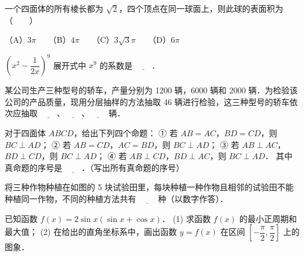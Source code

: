 \begin{question}
一个四面体的所有棱长都为 $\sqrt{2}$，四个顶点在同一球面上，则此球的表面积为\mbox{（　　）}

（A）$3\pi$　　（B）$4\pi$　　（C）$3\sqrt{3}\pi$　　（D）$6\pi$

\end{question}
\begin{question}
$\left(x^2 - \dfrac{1}{2x}\right)^9$ 展开式中 $x^9$ 的系数是 $\underline{\hspace{2em}}$．

\end{question}
\begin{question}
某公司生产三种型号的轿车，产量分别为 1200 辆，6000 辆和 2000 辆．为检验该公司的产品质量，现用分层抽样的方法抽取 46 辆进行检验，这三种型号的轿车依次应抽取 $\underline{\hspace{2em}}$、$\underline{\hspace{2em}}$、$\underline{\hspace{2em}}$ 辆．

\end{question}
\begin{question}
对于四面体 $ABCD$，给出下列四个命题：
① 若 $AB = AC$，$BD = CD$，则 $BC \perp AD$；
② 若 $AB = CD$，$AC = BD$，则 $BC \perp AD$；
③ 若 $AB \perp AC$，$BD \perp CD$，则 $BC \perp AD$；
④ 若 $AB \perp CD$，$BD \perp AC$，则 $BC \perp AD$．
其中真命题的序号是 $\underline{\hspace{2em}}$．（写出所有真命题的序号）

\Needspace{0.4\textheight}
\end{question}
\begin{question}
将三种作物种植在如图的 5 块试验田里，每块种植一种作物且相邻的试验田不能种植同一作物，不同的种植方法共有 $\underline{\hspace{2em}}$ 种（以数字作答）．
\nopagebreak[4]
\begin{center}\end{center}
\nopagebreak[4]
\Needspace{0.4\textheight}
\end{question}
\begin{question}
已知函数 $f(x) = 2\sin x(\sin x + \cos x)$．
(1) 求函数 $f(x)$ 的最小正周期和最大值；
(2) 在给出的直角坐标系中，画出函数 $y = f(x)$ 在区间 $\left[-\dfrac{\pi}{2}, \dfrac{\pi}{2}\right]$ 上的图象．
\nopagebreak[4]
\begin{center}\end{center}
\nopagebreak[4]
\end{question}
